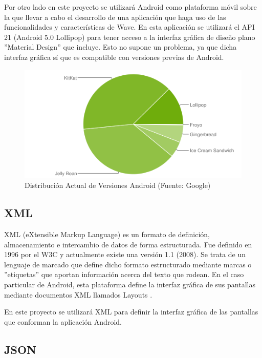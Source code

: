 	Por otro lado en este proyecto se utilizará Android como plataforma móvil sobre la que llevar a cabo el desarrollo de una aplicación que haga uso de las funcionalidades y características de Wave. En esta aplicación se utilizará el API 21 (Android 5.0 Lollipop) para tener acceso a la interfaz gráfica de diseño plano ''Material Design'' que incluye. Esto no supone un problema, ya que dicha interfaz gráfica sí que es compatible con versiones previas de Android.

	\begin{figure}[H]
      \centering
	\includegraphics[keepaspectratio, scale=0.8]{Media/Captures/androidUsage.png}
      \caption{Distribución Actual de Versiones Android (Fuente: Google)}
      \label{fig:android_Usage}
    \end{figure}
	
	
    
    \subsection{XML}\label{ssec:xml}
    
	XML \cite{ref:xml} (eXtensible Markup Language) es un formato de definición, almacenamiento e intercambio de datos de forma estructurada. Fue definido en 1996 por el W3C y actualmente existe una versión 1.1 (2008). Se trata de un lenguaje de marcado que define dicho formato estructurado mediante marcas o ''etiquetas'' que aportan información acerca del texto que rodean. En el caso particular de Android, esta plataforma define la interfaz gráfica de sus pantallas mediante documentos XML llamados Layouts \cite{ref:android_layout}.
	
	En este proyecto se utilizará XML para definir la interfaz gráfica de las pantallas que conforman la aplicación Android. 
    
    \subsection{JSON}\label{ssec:json}
    
